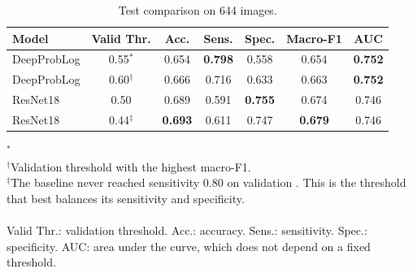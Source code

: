 \begin{table}[!t]
\caption{Test comparison on 644 images.}
\label{tab:comparison}
\centering
\footnotesize
\setlength{\tabcolsep}{4pt}
\begin{tabular}{@{}lcccccc@{}}
\toprule
Model & Valid Thr. & Acc. & Sens. & Spec. & Macro-F1 & AUC \\
\midrule
DeepProbLog & 0.55$^{*}$ & 0.654 & \textbf{0.798} & 0.558 & 0.654 & \textbf{0.752} \\
DeepProbLog & 0.60$^{\dagger}$ & 0.666 & 0.716 & 0.633 & 0.663 & \textbf{0.752} \\
ResNet18 & 0.50 & 0.689 & 0.591 & \textbf{0.755} & 0.674 & 0.746 \\
ResNet18 & 0.44$^{\ddagger}$ & \textbf{0.693} & 0.611 & 0.747 & \textbf{0.679} & 0.746 \\
\bottomrule
\end{tabular}

\vspace{0.45em}
\begin{minipage}{\columnwidth}
\footnotesize
$^{*}$\\
$^{\dagger}$Validation threshold with the highest macro-F1.\\
$^{\ddagger}$The baseline never reached sensitivity 0.80 on validation . This is the threshold that best balances its sensitivity and specificity.\\
\\
Valid Thr.: validation threshold. Acc.: accuracy. Sens.: sensitivity. Spec.: specificity. AUC: area under the curve, which does not depend on a fixed threshold.
\end{minipage}
\end{table}



\subsection{}
\label{sec:whysmall}

